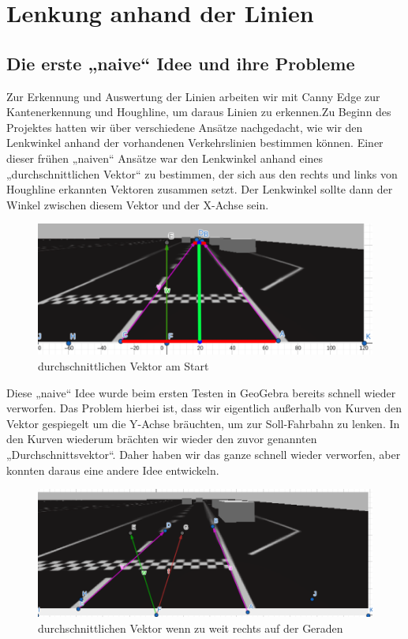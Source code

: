 \section{Lenkung anhand der Linien} %
\subsection{Die erste „naive“ Idee und ihre Probleme}
Zur Erkennung und Auswertung der Linien arbeiten wir mit Canny Edge zur Kantenerkennung und Houghline, um daraus Linien zu erkennen.Zu Beginn des Projektes hatten wir über verschiedene Ansätze nachgedacht, wie wir den Lenkwinkel anhand der vorhandenen Verkehrslinien bestimmen können. Einer dieser frühen „naiven“ Ansätze war den Lenkwinkel anhand eines „durchschnittlichen Vektor“ zu bestimmen, der sich aus den rechts und links von Houghline erkannten Vektoren zusammen setzt. Der Lenkwinkel sollte dann der Winkel zwischen diesem Vektor und der X-Achse sein. 
\begin{figure}[H]
	\centering	
	\includegraphics[width=.5\textwidth]{img/vector_gerade}
	\caption[durchschnittlichen Vektor am Start]{durchschnittlichen Vektor am Start}
	\label{fig:vector_gerade}
\end{figure}

Diese „naive“ Idee wurde beim ersten Testen in GeoGebra bereits schnell wieder verworfen. Das Problem hierbei ist, dass wir eigentlich außerhalb von Kurven  den Vektor gespiegelt um die Y-Achse bräuchten, um zur Soll-Fahrbahn zu lenken. In den Kurven wiederum brächten wir wieder den zuvor genannten „Durchschnittsvektor“. Daher haben wir das ganze schnell wieder verworfen, aber konnten daraus eine andere Idee entwickeln.

\begin{figure}[H]
	\centering	
	\includegraphics[width=.5\textwidth]{img/vector_zu_rechts}
	\caption[durchschnittlichen Vektor wenn zu weit rechts auf der Geraden]{durchschnittlichen Vektor wenn zu weit rechts auf der Geraden}
	\label{fig:vector_zu_rechts}
\end{figure}

